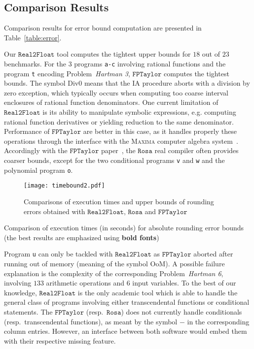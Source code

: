 \documentclass[preprint]{sigplanconf}
\newcommand{\code}[1]{\lstinline{#1}}
\newcommand{\nbenchs}{23}
\newcommand{\divzero}{\text{Div0}}
\newcommand{\realtofloat}{\mathtt{Real2Float}}
\newcommand{\rosa}{\mathtt{Rosa}}
\newcommand{\fptaylor}{\mathtt{FPTaylor}}
\theoremstyle{plain}
\begin{document}
\subsection{Comparison Results}
%
Comparison results for error bound computation are presented in Table~\ref{table:error}. 

Our $\realtofloat$ tool computes the tightest upper bounds for $18$ out of $\nbenchs$ benchmarks. For the $3$ programs \code{a-c} involving rational functions and the program \code{t} encoding Problem~\textit{Hartman 3}, $\fptaylor$ computes the tightest bounds. The symbol $\divzero$ means that the IA procedure aborts with a division by zero exception, which typically occurs when computing too coarse interval enclosures of rational function denominators.
One current limitation of $\realtofloat$ is its ability to manipulate symbolic expressions, e.g. computing rational function derivatives or yielding reduction to the same denominator. Performance of $\fptaylor$ are better in this case, as it handles properly these operations through the interface with the \textsc{Maxima} computer algebra system~\cite{maxima}.
Accordingly with the $\fptaylor$ paper~\cite{fptaylor15}, the $\rosa$ real compiler often provides coarser bounds, except for the two conditional programs \code{v} and \code{w} and the polynomial program \code{o}.
%
\begin{figure}[!ht]
\begin{center}
\texttt{[image: timebound2.pdf]}
\caption{Comparisons of execution times and upper bounds of rounding errors obtained with $\realtofloat$, $\rosa$ and $\fptaylor$}\label{fig:timebound}
\end{center}
\end{figure}
%
\begin{table}[!ht]
\begin{center}
\caption{Comparison of execution times (in seconds) for absolute rounding error bounds (the best results are emphasized using \textbf{bold fonts})}

\label{table:cpu}
\end{center}
\end{table}
%
Program \code{u} can only be tackled with $\realtofloat$ as $\fptaylor$ aborted after running out of memory (meaning of the symbol OoM). A possible failure explanation is the complexity of the corresponding Problem~\textit{Hartman 6}, involving $133$ arithmetic operations and $6$ input variables.
To the best of our knowledge, $\realtofloat$ is the only academic tool which is able to handle the general class of programs involving either transcendental functions or conditional statements. The $\fptaylor$ (resp.~$\rosa$) does not currently handle conditionals (resp.~transcendental functions), as meant by the symbol $-$ in the corresponding column entries. However, an interface between both software would embed them with their respective missing feature.
\end{document}
